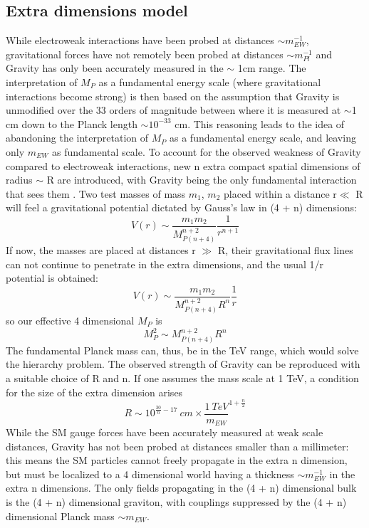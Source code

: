 \subsection{Extra dimensions model}
While electroweak interactions have been probed at distances $\sim m^{-1}_{EW}$, gravitational forces have not remotely been probed at distances  $\sim m^{-1}_{Pl}$
and Gravity has only been accurately measured in the $\sim$ 1cm range. The interpretation of $M_{P}$ as a fundamental energy scale (where gravitational interactions become strong) is then based on the assumption that Gravity is unmodified over the 33 orders of magnitude between where it is measured at $\sim$1 cm down to the Planck length $\sim10^{-33}$ cm. This reasoning leads to the idea of abandoning the interpretation of $M_{P}$ as a fundamental energy scale, and leaving only $m_{EW}$ as fundamental scale. To account for the observed weakness of Gravity compared to electroweak interactions, new n extra compact spatial dimensions of radius $\sim$ R are introduced, with Gravity being the only fundamental interaction that sees them \cite{ExtraDimentions}. 
Two test masses of mass $m_1$, $m_2$ placed within a distance r$\ll$ R will feel a gravitational potential dictated by Gauss's law in (4 + n) dimensions:
\[
V(r) \sim \frac{m_1m_2}{M^{n+2}_{P(n+4)}} \frac{1}{r^{n+1}}
\]
If now, the masses are placed at distances r $\gg$ R, their gravitational flux lines can not continue to penetrate in the extra dimensions, and the usual 1/r potential is obtained:
\[
V(r) \sim \frac{m_1m_2}{M^{n+2}_{P(n+4)}R^n} \frac{1}{r}
\]
so our effective 4 dimensional $M_{P}$ is
\[
M^2_{P} \sim M^{n+2}_{P(n+4)}R^n
\]
The fundamental Planck mass can, thus, be in the TeV range, which would solve the hierarchy problem. The observed strength of Gravity can be reproduced with a suitable choice of R and n. If one assumes the mass scale at 1 TeV, a condition for the size of the extra dimension arises
\[
R \sim 10^{\frac{30}{n}-17}\ cm \times \frac{1\ TeV}{m_{EW}}^{1+\frac{n}{2}}
\]
While the SM gauge forces have been accurately measured at weak scale distances, Gravity has not been probed at distances smaller than a millimeter: this means the SM particles cannot freely propagate in the extra n dimension, but must be localized to a 4 dimensional world having a thickness $\sim m_{EW}^{-1}$ in the extra n dimensions. The only fields propagating in the (4 + n) dimensional bulk is the (4 + n) dimensional graviton, with couplings suppressed by the (4 + n) dimensional Planck mass $\sim m_{EW}$.

